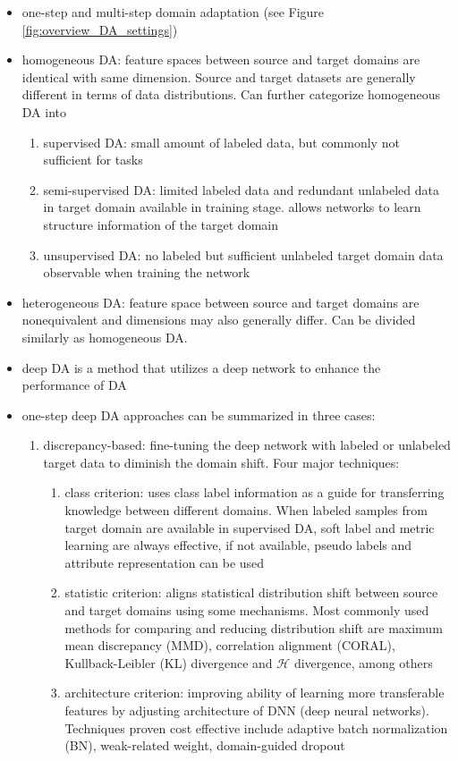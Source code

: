 \documentclass[]{article}
\begin{document}
\begin{itemize}
	\item one-step and multi-step domain adaptation (see Figure \ref{fig:overview_DA_settings})
	\item homogeneous DA: feature spaces between source and target domains are identical with same dimension. Source and target datasets are generally different in terms of data distributions. Can further categorize homogeneous DA into
	\begin{enumerate}
		\item supervised DA: small amount of labeled data, but commonly not sufficient for tasks
		\item semi-supervised DA: limited labeled data and redundant unlabeled data in target domain available in training stage. allows networks to learn structure information of the target domain
		\item unsupervised DA: no labeled but sufficient unlabeled target domain data observable when training the network
	\end{enumerate}
	\item heterogeneous DA: feature space between source and target domains are nonequivalent and dimensions may also generally differ. Can be divided similarly as homogeneous DA.
	\item deep DA is a method that utilizes a deep network to enhance the performance of DA
	\item one-step deep DA approaches can be summarized in three cases:
	\begin{enumerate}
		\item discrepancy-based: fine-tuning the deep network with labeled or unlabeled target data to diminish the domain shift. Four major techniques:
		\begin{enumerate}
			\item class criterion: uses class label information as a guide for transferring knowledge between different domains. When labeled samples from target domain are available in supervised DA, soft label and metric learning are always effective, if not available, pseudo labels and attribute representation can be used
			\item statistic criterion: aligns statistical distribution shift between source and target domains using some mechanisms. Most commonly used methods for comparing and reducing distribution shift are maximum mean discrepancy (MMD), correlation alignment (CORAL), Kullback-Leibler (KL) divergence and $\mathcal{H}$ divergence, among others
			\item architecture criterion: improving ability of learning more transferable features by adjusting architecture of DNN (deep neural networks). Techniques proven cost effective include adaptive batch normalization (BN), weak-related weight, domain-guided dropout

\end{enumerate}
\end{enumerate}
\end{itemize}
\end{document}
